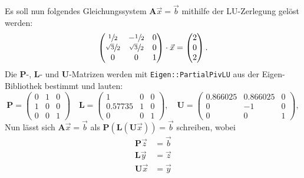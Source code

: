\documentclass{scrartcl}
\begin{document}
            Es soll nun folgendes Gleichungssystem \(\mathbf{A} \vec{x} = \vec{b}\) mithilfe der LU-Zerlegung gelöst werden:
            \begin{equation*}
                \begin{pmatrix}
                    \sfrac{1}{2} & -\sfrac{1}{2} & 0 \\
                    \sfrac{\sqrt{3}}{2} & \sfrac{\sqrt{3}}{2} & 0 \\
                    0 & 0 & 1 
                \end{pmatrix}
                \cdot \vec{x} =
                \begin{pmatrix}
                    2 \\ 
                    0 \\ 
                    2 
                \end{pmatrix}.
            \end{equation*}
            Die $\mathbf{P}$-, $\mathbf{L}$- und $\mathbf{U}$-Matrizen werden mit \verb|Eigen::PartialPivLU| aus der Eigen-Bibliothek bestimmt und lauten:
            \[
                \mathbf{P} = 
                \begin{pmatrix}
                    0 & 1 & 0 \\
                    1 & 0 & 0 \\
                    0 & 0 & 1 
                \end{pmatrix}
                \quad
                \mathbf{L} =
                \begin{pmatrix}
                    1 & 0 & 0 \\
                    0.57735 & 1 & 0 \\
                    0 & 0 & 1 
                \end{pmatrix},
                \quad
                \mathbf{U} = 
                \begin{pmatrix}
                    0.866025 & 0.866025 & 0 \\
                    0 & -1 & 0 \\
                    0 & 0 & 1 
                \end{pmatrix},
            \]
            Nun lässt sich $\mathbf{A} \vec{x} = \vec{b}$ als $\mathbf{P} (\mathbf{L} (\mathbf{U} \vec{x})) = \vec{b}$ schreiben, 
            wobei
            \begin{align}
                \mathbf{P} \vec{z} &= \vec{b} \label{eqn:1} \\
                \mathbf{L} \vec{y} &= \vec{z} \label{eqn:2} \\
                \mathbf{U} \vec{x} &= \vec{y} \label{eqn:3}
            \end{align}
\end{document}
